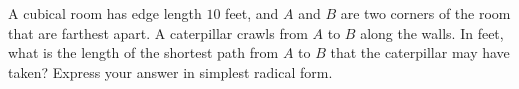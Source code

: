 A cubical room has edge length $10$ feet, and $A$ and $B$ are two corners of the room that are farthest apart. A caterpillar crawls from $A$ to $B$ along the walls. In feet, what is the length of the shortest path from $A$ to $B$ that the caterpillar may have taken? Express your answer in simplest radical form.
